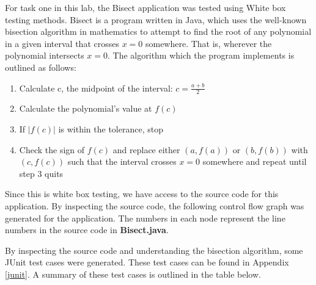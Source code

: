 For task one in this lab, the Bisect application was tested using White box
testing methods. Bisect is a program written in Java, which
uses the well-known bisection algorithm in mathematics to attempt to find the
root of any polynomial in a given interval that crosses $x=0$ somewhere. That
is, wherever the polynomial intersects $x=0$.
The algorithm which the program implements is outlined as follows:

\begin{enumerate}
	\item Calculate c, the midpoint of the interval: $ c = \frac{a+b}{2} $
	\item Calculate the polynomial's value at $f(c)$
	\item If $|f(c)|$ is within the tolerance, stop
	\item Check the sign of $f(c)$ and replace either $(a, f(a))$ or $(b, f(b))$
	      with $(c, f(c))$ such that the interval crosses $x=0$ somewhere and repeat
	      until step 3 quits
\end{enumerate}

Since this is white box testing, we have access to the source code for this
application. By inspecting the source code, the following control flow graph was
generated for the application. The numbers in each node represent the line
numbers in the source code in \textbf{Bisect.java}.

\begin{adjustbox}{center, height=\textheight}
\end{adjustbox}

By inspecting the source code and understanding the bisection algorithm,
some JUnit test cases were generated. These test cases can be found in Appendix
\ref{junit}. A summary of these test cases is outlined in the table below.
\vspace{1cm}

